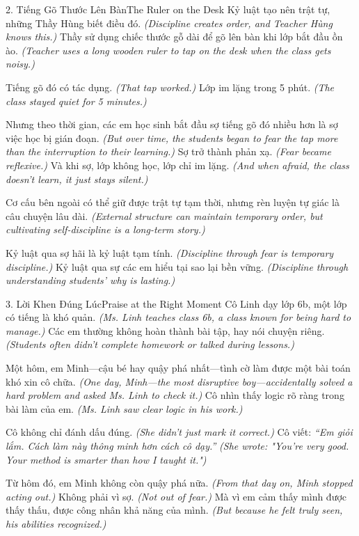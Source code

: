 \begin{truyen}{2. Tiếng Gõ Thước Lên Bàn}{The Ruler on the Desk}
Kỷ luật tạo nên trật tự, những Thầy Hùng biết điều đó.
\textit{(Discipline creates order, and Teacher Hùng knows this.)}
Thầy sử dụng chiếc thước gỗ dài để gõ lên bàn khi lớp bắt đầu ồn ào.
\textit{(Teacher uses a long wooden ruler to tap on the desk when the class gets noisy.)}

Tiếng gõ đó có tác dụng.
\textit{(That tap worked.)}
Lớp im lặng trong 5 phút.
\textit{(The class stayed quiet for 5 minutes.)}

Nhưng theo thời gian, các em học sinh bắt đầu sợ tiếng gõ đó nhiều hơn là sợ việc học bị gián đoạn.
\textit{(But over time, the students began to fear the tap more than the interruption to their learning.)}
Sợ trở thành phản xạ.
\textit{(Fear became reflexive.)}
Và khi sợ, lớp không học, lớp chỉ im lặng.
\textit{(And when afraid, the class doesn't learn, it just stays silent.)}

Cơ cấu bên ngoài có thể giữ được trật tự tạm thời, nhưng rèn luyện tự giác là câu chuyện lâu dài.
\textit{(External structure can maintain temporary order, but cultivating self-discipline is a long-term story.)}
\end{truyen}

\begin{baihoc}
Kỷ luật qua sợ hãi là kỷ luật tạm tính.
\textit{(Discipline through fear is temporary discipline.)}
Kỷ luật qua sự các em hiểu tại sao lại bền vững.
\textit{(Discipline through understanding students' why is lasting.)}
\end{baihoc}

\begin{truyen}{3. Lời Khen Đúng Lúc}{Praise at the Right Moment}
Cô Linh dạy lớp 6b, một lớp có tiếng là khó quản.
\textit{(Ms. Linh teaches class 6b, a class known for being hard to manage.)}
Các em thường không hoàn thành bài tập, hay nói chuyện riêng.
\textit{(Students often didn't complete homework or talked during lessons.)}

Một hôm, em Minh—cậu bé hay quậy phá nhất—tình cờ làm được một bài toán khó xin cô chữa.
\textit{(One day, Minh—the most disruptive boy—accidentally solved a hard problem and asked Ms. Linh to check it.)}
Cô nhìn thấy logic rõ ràng trong bài làm của em.
\textit{(Ms. Linh saw clear logic in his work.)}

Cô không chỉ đánh dấu đúng.
\textit{(She didn't just mark it correct.)}
Cô viết: \textit{``Em giỏi lắm. Cách làm này thông minh hơn cách cô dạy.''}
\textit{(She wrote: "You're very good. Your method is smarter than how I taught it.")}

Từ hôm đó, em Minh không còn quậy phá nữa.
\textit{(From that day on, Minh stopped acting out.)}
Không phải vì sợ.
\textit{(Not out of fear.)}
Mà vì em cảm thấy mình được thấy thấu, được công nhân khả năng của mình.
\textit{(But because he felt truly seen, his abilities recognized.)}
\end{truyen}


